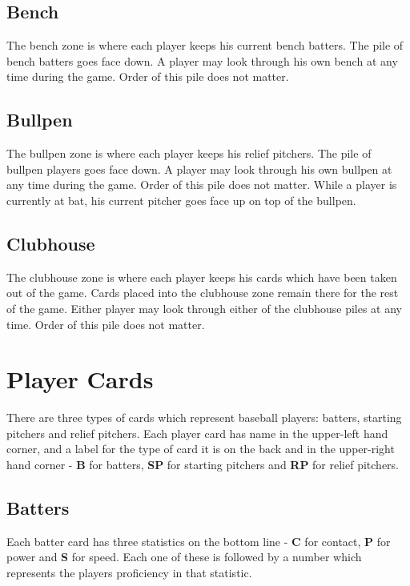 \documentclass[12pt]{article} %
\begin{document}
\subsection{Bench}

The bench zone is where each player keeps his current bench batters. The pile of bench batters goes face down.  A player may look through his own bench at any time during the game.  Order of this pile does not matter.

\subsection{Bullpen}

The bullpen zone is where each player keeps his relief pitchers. The pile of bullpen players goes face down.  A player may look through his own bullpen at any time during the game.  Order of this pile does not matter.  While a player is currently at bat, his current pitcher goes face up on top of the bullpen.

\subsection{Clubhouse}

The clubhouse zone is where each player keeps his cards which have been taken out of the game.  Cards placed into the clubhouse zone remain there for the rest of the game.  Either player may look through either of the clubhouse piles at any time.  Order of this pile does not matter.

\section{Player Cards}

There are three types of cards which represent baseball players: batters, starting pitchers and relief pitchers.  Each player card has name in the upper-left hand corner, and a label for the type of card it is on the back and in the upper-right hand corner - \textbf{B} for batters, \textbf{SP} for starting pitchers and \textbf{RP} for relief pitchers.

\subsection{Batters}

Each batter card has three statistics on the bottom line - \textbf{C} for contact, \textbf{P} for power and \textbf{S} for speed.  Each one of these is followed by a number which represents the players proficiency in that statistic.
\end{document}
